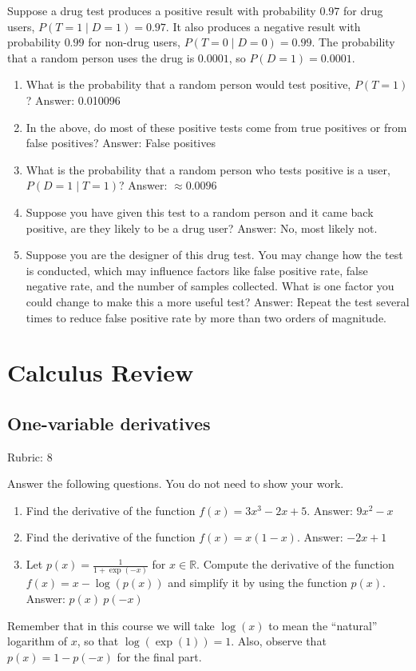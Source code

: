 \documentclass{article}
\newcommand{\ans}[1]{\green{Answer: #1}}
\newcommand{\rubric}[1]{\green{Rubric: #1}}
\newcommand{\blue}[1]{{\color{blue}#1}}
\newcommand{\green}[1]{{\color{green}#1}}
\newcommand{\R}{\mathbb{R}}
\begin{document}
    Suppose a drug test produces a positive result with probability $0.97$ for drug users, $P(T=1 \mid D=1)=0.97$. It also produces a negative result with probability $0.99$ for non-drug users, $P(T=0 \mid D=0)=0.99$. The probability that a random person uses the drug is $0.0001$, so $P(D=1)=0.0001$.

    \begin{enumerate}
        \item What is the probability that a random person would test positive, $P(T=1)$? \ans{0.010096}
        \item In the above, do most of these positive tests come from true positives or from false positives? \ans{False positives}
        \item What is the probability that a random person who tests positive is a user, $P(D=1 \mid T=1)$? \ans{$\approx 0.0096$}
        \item Suppose you have given this test to a random person and it came back positive, are they likely to be a drug user? \ans{No, most likely not.}
        \item Suppose you are the designer of this drug test. You may change how the test is conducted, which may influence factors like false positive rate, false negative rate, and the number of samples collected. What is one factor you could change to make this a more useful test? \ans{Repeat the test several times to reduce false positive rate by more than two orders of magnitude.}
    \end{enumerate}


    \section{Calculus Review}
    
    \subsection{One-variable derivatives}
    \rubric{8}

    \blue{Answer the following questions.} You do not need to show your work.

    \begin{enumerate}
        \item Find the derivative of the function $f(x) = 3x^3 -2x + 5$. \ans{$9x^2 - x$}
        \item Find the derivative of the function $f(x) = x(1-x)$. \ans{$-2x + 1$}
        \item Let $p(x) = \frac{1}{1+\exp(-x)}$ for $x \in \R$. Compute the derivative of the function $f(x) = x-\log(p(x))$ and simplify it by using the function $p(x)$. \ans{$p(x)\:p(-x)$}
    \end{enumerate}
    Remember that in this course we will take $\log(x)$ to mean the ``natural'' logarithm of $x$, so that $\log(\exp(1)) = 1$. Also, observe that $p(x) = 1-p(-x)$ for the final part.
\end{document}

